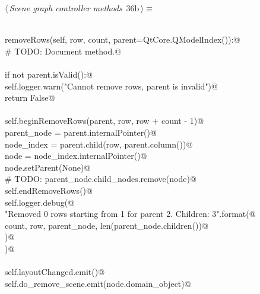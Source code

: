 \documentclass[
    a4paper,      %
    10pt,         %
    openright,    %
    notitlepage,  %
    parskip=half, %
]{scrreprt}       %
\theoremstyle{definition}                    %
\begin{document}
\begin{flushleft} \small
\begin{minipage}{\linewidth}\label{scrap43}\raggedright\small
{} $\langle\,${\itshape Scene graph controller methods}\nobreak\ {\footnotesize {36b}}$\,\rangle\equiv$
\vspace{-1exm}
\begin{list}{}{} \item
\mbox{}\lstinline@@\\
\mbox{}\lstinline@def removeRows(self, row, count, parent=QtCore.QModelIndex()):@\\
\mbox{}\lstinline@    # TODO: Document method.@\\
\mbox{}\lstinline@@\\
\mbox{}\lstinline@    if not parent.isValid():@\\
\mbox{}\lstinline@        self.logger.warn("Cannot remove rows, parent is invalid")@\\
\mbox{}\lstinline@        return False@\\
\mbox{}\lstinline@@\\
\mbox{}\lstinline@    self.beginRemoveRows(parent, row, row + count - 1)@\\
\mbox{}\lstinline@    parent_node = parent.internalPointer()@\\
\mbox{}\lstinline@    node_index = parent.child(row, parent.column())@\\
\mbox{}\lstinline@    node       = node_index.internalPointer()@\\
\mbox{}\lstinline@    node.setParent(None)@\\
\mbox{}\lstinline@    # TODO: parent_node.child_nodes.remove(node)@\\
\mbox{}\lstinline@    self.endRemoveRows()@\\
\mbox{}\lstinline@    self.logger.debug(@\\
\mbox{}\lstinline@        "Removed {0} rows starting from {1} for parent {2}. Children: {3}".format(@\\
\mbox{}\lstinline@            count, row, parent_node, len(parent_node.children())@\\
\mbox{}\lstinline@        )@\\
\mbox{}\lstinline@    )@\\
\mbox{}\lstinline@@\\
\mbox{}\lstinline@    self.layoutChanged.emit()@\\
\mbox{}\lstinline@    self.do_remove_scene.emit(node.domain_object)@\\

\end{list}
\end{minipage}
\end{flushleft}
\end{document}
